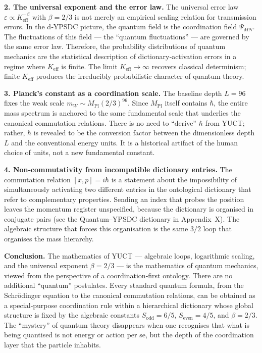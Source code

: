 \documentclass[11pt,a4paper]{article}
\begin{document}
\medskip
\noindent\textbf{2. The universal exponent and the error law.}
The universal error law $\varepsilon \propto K_{\mathrm{eff}}^{-\beta}$
with $\beta = 2/3$ is not merely an empirical scaling relation for
transmission errors.  In the d‑YPSDC picture, the quantum field is
the coordination field $\Psi_{MN}$.  The fluctuations of this field
--- the ``quantum fluctuations'' --- are governed by the same error law.
Therefore, the probability distributions of quantum mechanics are
the statistical description of dictionary‑activation errors in a
regime where $K_{\mathrm{eff}}$ is finite.  The limit
$K_{\mathrm{eff}}\to\infty$ recovers classical determinism; finite
$K_{\mathrm{eff}}$ produces the irreducibly probabilistic character
of quantum theory.

\medskip
\noindent\textbf{3. Planck's constant as a coordination scale.}
The baseline depth $L=96$ fixes the weak scale
$m_W \sim M_{\mathrm{Pl}}(2/3)^{96}$.  Since $M_{\mathrm{Pl}}$
itself contains $\hbar$, the entire mass spectrum is anchored to
the same fundamental scale that underlies the canonical commutation
relations.  There is no need to ``derive'' $\hbar$ from YUCT;
rather, $\hbar$ is revealed to be the conversion factor between
the dimensionless depth $L$ and the conventional energy units.
It is a historical artifact of the human choice of units, not a
new fundamental constant.

\medskip
\noindent\textbf{4. Non‑commutativity from incompatible dictionary entries.}
The commutation relation $[x,p]=i\hbar$ is a statement about the
impossibility of simultaneously activating two different entries
in the ontological dictionary that refer to complementary
properties.  Sending an index that probes the position leaves
the momentum register unspecified, because the dictionary is
organised in conjugate pairs (see the Quantum–YPSDC dictionary
in Appendix~X).  The algebraic structure that forces this
organisation is the same $3/2$ loop that organises the mass
hierarchy.

\medskip
\noindent
\textbf{Conclusion.}  The mathematics of YUCT --- algebraic loops,
logarithmic scaling, and the universal exponent $\beta=2/3$ --- is
the mathematics of quantum mechanics, viewed from the perspective
of a coordination‑first ontology.  There are no additional
``quantum'' postulates.  Every standard quantum formula, from the
Schrödinger equation to the canonical commutation relations, can
be obtained as a special‑purpose coordination rule within a
hierarchical dictionary whose global structure is fixed by the
algebraic constants $S_{\mathrm{odd}}=6/5$, $S_{\mathrm{even}}=4/5$,
and $\beta=2/3$.  The ``mystery'' of quantum theory disappears when
one recognises that what is being quantised is not energy or action
per se, but the depth of the coordination layer that the particle
inhabits.
\end{document}
